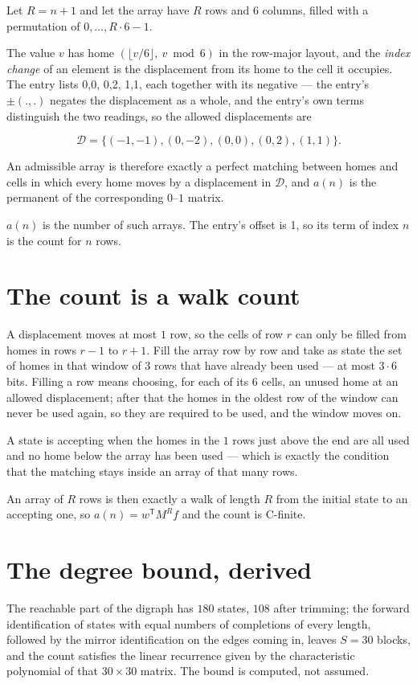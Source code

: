 \documentclass[11pt]{article}
\theoremstyle{definition}
\begin{document}
Let $R = n + 1$ and let the array have $R$ rows and $6$ columns, filled with a permutation of $0,\dots,R\cdot6-1$.

The value $v$ has home $(\lfloor v/6\rfloor,\ v \bmod 6)$ in the row-major layout, and the {\itshape index change} of an element is the displacement from its home to the cell it occupies. The entry lists 0,0, 0,2, 1,1, each together with its negative --- the entry's $\pm(.,.)$ negates the displacement as a whole, and the entry's own terms distinguish the two readings, so the allowed displacements are

\[\mathcal{D} = \{(-1,-1), (0,-2), (0,0), (0,2), (1,1)\}.\]

An admissible array is therefore exactly a perfect matching between homes and cells in which every home moves by a displacement in $\mathcal{D}$, and $a(n)$ is the permanent of the corresponding $0$--$1$ matrix.

$a(n)$ is the number of such arrays. The entry's offset is 1, so its term of index $n$ is the count for $n$ rows.

\section{The count is a walk count}

A displacement moves at most $1$ row, so the cells of row $r$ can only be filled from homes in rows $r-1$ to $r+1$. Fill the array row by row and take as state the set of homes in that window of $3$ rows that have already been used --- at most $3\cdot6$ bits. Filling a row means choosing, for each of its $6$ cells, an unused home at an allowed displacement; after that the homes in the oldest row of the window can never be used again, so they are required to be used, and the window moves on.

A state is accepting when the homes in the $1$ rows just above the end are all used and no home below the array has been used --- which is exactly the condition that the matching stays inside an array of that many rows.

An array of $R$ rows is then exactly a walk of length $R$ from the initial state to an accepting one, so $a(n) = w^{\mathsf T}M^{R}f$ and the count is C-finite.

\section{The degree bound, derived}

The reachable part of the digraph has $180$ states, $108$ after trimming; the forward identification of states with equal numbers of completions of every length, followed by the mirror identification on the edges coming in, leaves $S = 30$ blocks, and the count satisfies the linear recurrence given by the characteristic polynomial of that $30\times30$ matrix. The bound is computed, not assumed.
\end{document}
